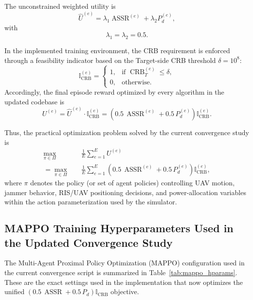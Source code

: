 \documentclass[journal,onecolumn]{IEEEtran}
\begin{document}
The unconstrained weighted utility is
\begin{equation}
    \widehat{U}^{(e)} = \lambda_1 \operatorname{ASSR}^{(e)} + \lambda_2 P_d^{(e)},
\end{equation}
with
\begin{equation}
    \lambda_1 = \lambda_2 = 0.5.
\end{equation}

In the implemented training environment, the CRB requirement is enforced through a feasibility indicator based on the Target-side CRB threshold $\delta = 10^8$:
\begin{equation}
    \mathbb{I}_{\text{CRB}}^{(e)} =
    \begin{cases}
        1, & \text{if } \operatorname{CRB}_{T}^{(e)} \le \delta, \\
        0, & \text{otherwise.}
    \end{cases}
\end{equation}
Accordingly, the final episode reward optimized by every algorithm in the updated codebase is
\begin{equation}
    U^{(e)} = \widehat{U}^{(e)} \cdot \mathbb{I}_{\text{CRB}}^{(e)}
    = \left( 0.5\,\operatorname{ASSR}^{(e)} + 0.5\,P_d^{(e)} \right)\mathbb{I}_{\text{CRB}}^{(e)}.
\end{equation}

Thus, the practical optimization problem solved by the current convergence study is
\begin{align}
    \max_{\pi \in \Pi} \quad & \frac{1}{E}\sum_{e=1}^{E} U^{(e)} \\
    = \max_{\pi \in \Pi} \quad & \frac{1}{E}\sum_{e=1}^{E}
    \left( 0.5\,\operatorname{ASSR}^{(e)} + 0.5\,P_d^{(e)} \right)\mathbb{I}_{\text{CRB}}^{(e)},
\end{align}
where $\pi$ denotes the policy (or set of agent policies) controlling UAV motion, jammer behavior, RIS/UAV positioning decisions, and power-allocation variables within the action parameterization used by the simulator.

\subsection{MAPPO Training Hyperparameters Used in the Updated Convergence Study}
The Multi-Agent Proximal Policy Optimization (MAPPO) configuration used in the current convergence script is summarized in Table~\ref{tab:mappo_hparams}. These are the exact settings used in the implementation that now optimizes the unified $\left(0.5\,\operatorname{ASSR} + 0.5\,P_d\right)\mathbb{I}_{\text{CRB}}$ objective.
\end{document}
